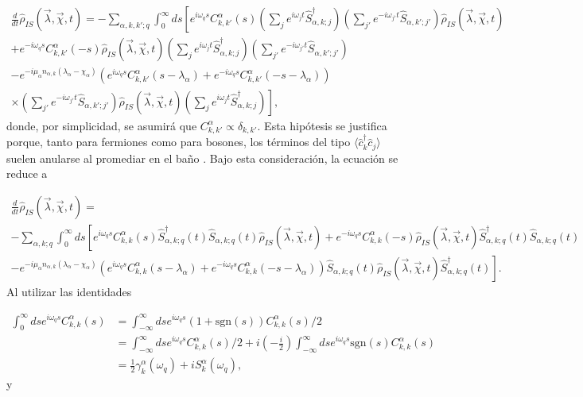 \begin{appendixs}
\begin{multline*}
    \frac{d}{dt}\hat{\rho}_{IS}(\vec{\lambda},\vec{\chi},t) = - \sum_{\alpha,k,k';q} \int_{0}^{\infty}ds \left[e^{i\omega_{q}s}C^{\alpha}_{k,k'}(s) \left(\sum_{j}e^{i\omega_{j}t}\hat{S}^{\dagger}_{\alpha,k;j} \right)\left(\sum_{j'}e^{-i\omega_{j'}t}\hat{S}_{\alpha,k';j'} \right)\hat{\rho}_{IS}(\vec{\lambda},\vec{\chi},t)  \right. \\
    \left. +  e^{-i\omega_{q}s}C^{\alpha}_{k,k'}(-s) \hat{\rho}_{IS}(\vec{\lambda},\vec{\chi},t) \left(\sum_{j}e^{i\omega_{j}t}\hat{S}^{\dagger}_{\alpha,k;j} \right)\left(\sum_{j'}e^{-i\omega_{j'}t}\hat{S}_{\alpha,k';j'} \right)\right. \\
    \left. - e^{-i\mu_{\alpha}n_{\alpha,k}(\lambda_{\alpha}-\chi_{\alpha})}(e^{i\omega_{q}s}C^{\alpha}_{k,k'}(s-\lambda_{\alpha}) + e^{-i\omega_{q}s}C^{\alpha}_{k,k'}(-s-\lambda_{\alpha}) ) \right.\\
    \left.\times \left(\sum_{j'}e^{-i\omega_{j'}t}\hat{S}_{\alpha,k';j'} \right)\hat{\rho}_{IS}(\vec{\lambda},\vec{\chi},t) \left(\sum_{j}e^{i\omega_{j}t}\hat{S}^{\dagger}_{\alpha,k;j} \right)    \right],   
\end{multline*}
donde, por simplicidad, se asumirá que $C_{k,k'}^{\alpha} \propto \delta_{k,k'}$. Esta hipótesis se justifica porque, tanto para fermiones como para bosones, los términos del tipo $\langle \hat{c}^{\dagger}_{k}\hat{c}_{j}\rangle$ suelen anularse al promediar en el baño \cite{potts2021thermodynamically}. Bajo esta consideración, la ecuación se reduce a

\begin{multline*}
    \frac{d}{dt}\hat{\rho}_{IS}(\vec{\lambda},\vec{\chi},t) = \\
     - \sum_{\alpha,k;q} \int_{0}^{\infty}ds \left[e^{i\omega_{q}s}C^{\alpha}_{k,k}(s) \hat{S}^{\dagger}_{\alpha,k;q}(t)\hat{S}_{\alpha,k;q}(t)\hat{\rho}_{IS}(\vec{\lambda},\vec{\chi},t)  +  e^{-i\omega_{q}s}C^{\alpha}_{k,k}(-s) \hat{\rho}_{IS}(\vec{\lambda},\vec{\chi},t) \hat{S}^{\dagger}_{\alpha,k;q}(t) \hat{S}_{\alpha,k;q}(t) \right. \\
    \left. - e^{-i\mu_{\alpha}n_{\alpha,k}(\lambda_{\alpha}-\chi_{\alpha})}(e^{i\omega_{q}s}C^{\alpha}_{k,k}(s-\lambda_{\alpha}) + e^{-i\omega_{q}s}C^{\alpha}_{k,k}(-s-\lambda_{\alpha}) ) \hat{S}_{\alpha,k;q}(t) \hat{\rho}_{IS}(\vec{\lambda},\vec{\chi},t) \hat{S}^{\dagger}_{\alpha,k;q}(t)    \right].  
\end{multline*}
Al utilizar las identidades

\begin{align*}
    \int_{0}^{\infty}ds e^{i\omega_{q}s}C^{\alpha}_{k,k}(s) & = \int_{-\infty}^{\infty}ds e^{i\omega_{q}s}(1+\text{sgn}(s))C^{\alpha}_{k,k}(s)/2 \\
    & = \int_{-\infty}^{\infty}ds e^{i\omega_{q}s}C^{\alpha}_{k,k}(s)/2 + i \left(-\frac{i}{2} \right) \int_{-\infty}^{\infty}ds e^{i\omega_{q}s} \text{sgn}(s)C^{\alpha}_{k,k}(s) \\
    & = \frac{1}{2}\gamma_{k}^{\alpha}(\omega_{q}) + i S^{\alpha}_{k}(\omega_{q}),
\end{align*}
y 


\end{appendixs}
